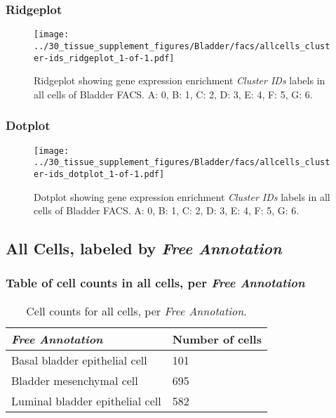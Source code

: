 \clearpage

\subsubsection{Ridgeplot}
\begin{figure}[h]
\centering
\texttt{[image: ../30\_tissue\_supplement\_figures/Bladder/facs/allcells\_cluster-ids\_ridgeplot\_1-of-1.pdf]}

\caption{ Ridgeplot  showing gene expression enrichment \emph{Cluster IDs} labels in all cells of Bladder FACS. A: 0, B: 1, C: 2, D: 3, E: 4, F: 5, G: 6.}
\end{figure}


\clearpage

\subsubsection{Dotplot}
\begin{figure}[h]
\centering
\texttt{[image: ../30\_tissue\_supplement\_figures/Bladder/facs/allcells\_cluster-ids\_dotplot\_1-of-1.pdf]}

\caption{ Dotplot  showing gene expression enrichment \emph{Cluster IDs} labels in all cells of Bladder FACS. A: 0, B: 1, C: 2, D: 3, E: 4, F: 5, G: 6.}
\end{figure}


\clearpage

\subsection{All Cells, labeled by \emph{Free Annotation}}
\subsubsection{Table of cell counts in all cells, per \emph{Free Annotation}}\begin{table}[h]
\centering
\label{my-label}
\begin{tabular}{@{}ll@{}}
\toprule

\emph{Free Annotation}& Number of cells \\ \midrule
Basal bladder epithelial cell & 101 \\

Bladder mesenchymal cell & 695 \\

Luminal bladder epithelial cell & 582 \\
\bottomrule
\end{tabular}
\caption{Cell counts for all cells, per \emph{Free Annotation}.}
\end{table}

